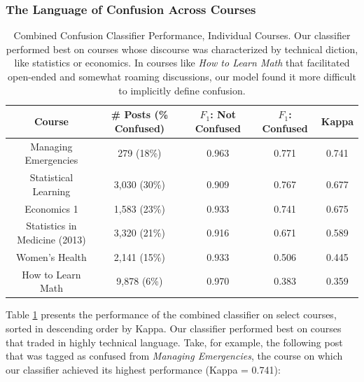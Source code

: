 \documentclass{edm_template}
\begin{document}
\subsubsection{The Language of Confusion Across Courses}

\begin{table}
       \centering
       \begin{tabular}{|c|c|c|c|c|}
       \hline
       Course                         & \# Posts (\% Confused) & $F_{1}$: Not Confused & $F_{1}$: Confused & Kappa \\ \hline
       Managing Emergencies              & 279 (18\%)                         & 0.963                 & 0.771             & 0.741 \\ \hline
       Statistical Learning              & 3,030 (30\%)                        & 0.909                 & 0.767             & 0.677 \\ \hline
       Economics 1                       & 1,583 (23\%)                     & 0.933                 & 0.741             & 0.675 \\ \hline
       Statistics in Medicine (2013)     & 3,320 (21\%)                         & 0.916                 & 0.671             & 0.589 \\ \hline
       Women's Health                    & 2,141 (15\%)                         & 0.933                 & 0.506             & 0.445 \\ \hline
       How to Learn Math                 & 9,878 (6\%)                        & 0.970                 & 0.383             & 0.359 \\ \hline
       \end{tabular}
       \caption{\textnormal{
       Combined Confusion Classifier Performance, Individual Courses. Our classifier performed best on courses whose discourse was characterized by technical diction, like statistics or economics. In courses like \emph{How to Learn Math} that facilitated open-ended and somewhat roaming discussions, our model found it more difficult to implicitly define confusion. 
       }} %
       \label{table:confusion_courses} %
\end{table}

Table \ref{table:confusion_courses} presents the performance of the combined classifier on select courses, sorted in descending order by Kappa. Our classifier performed best on courses that traded in highly technical language. Take, for example, the following post that was tagged as confused from \emph{Managing Emergencies}, the course on which our classifier achieved its highest performance (Kappa = 0.741):
\end{document}
